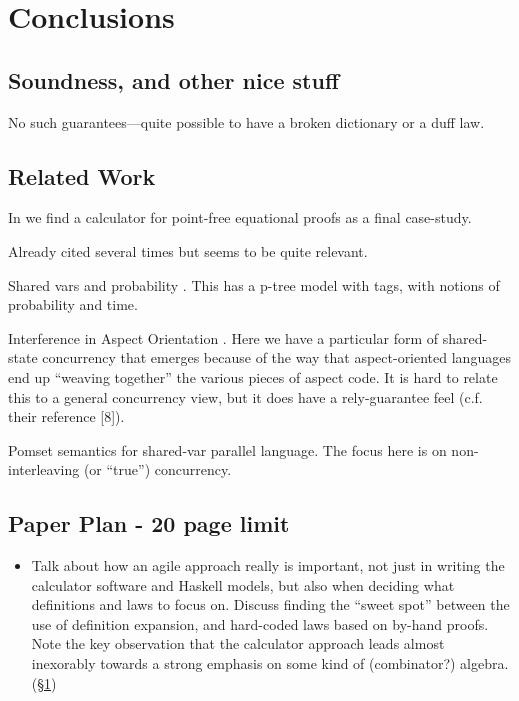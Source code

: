 \section{Conclusions}\label{sec:Conc}

\subsection{Soundness, and other nice stuff}

No such guarantees---quite possible to have a broken dictionary
or a duff law.

\subsection{Related Work}

In \cite{Bird14} we find a calculator
for point-free equational proofs as a final case-study.

Already cited several times but \cite{Gibbons:2014:FDS}
seems to be quite relevant.

Shared  vars and probability \cite{DBLP:conf/utp/ZhuSHQ12}.
This has a p-tree model with tags, with notions of probability and time.

Interference in Aspect Orientation \cite{DBLP:conf/utp/ChenYD10}.
Here we have a particular form of shared-state concurrency
that emerges because of the way that aspect-oriented languages
end up ``weaving together'' the various pieces of aspect code.
It is hard to relate this to a general concurrency view,
but it does have a rely-guarantee feel (c.f. their reference [8]).

Pomset semantics for shared-var parallel language\cite{DBLP:conf/utp/ZhaoWZ10}.
The focus here is on non-interleaving (or ``true'') concurrency.

\subsection*{Paper Plan - 20 page limit}

\begin{itemize}
  \item
    Talk about how an agile approach really is important,
    not just in writing the calculator software and Haskell models,
    but also when deciding what definitions and laws to focus on.
    Discuss finding the ``sweet spot'' between the use of definition
    expansion, and hard-coded laws based on by-hand proofs.
    Note the key observation that the calculator approach
    leads almost inexorably towards a strong emphasis
    on some kind of (combinator?) algebra. (\S\ref{sec:Conc})
\end{itemize}
